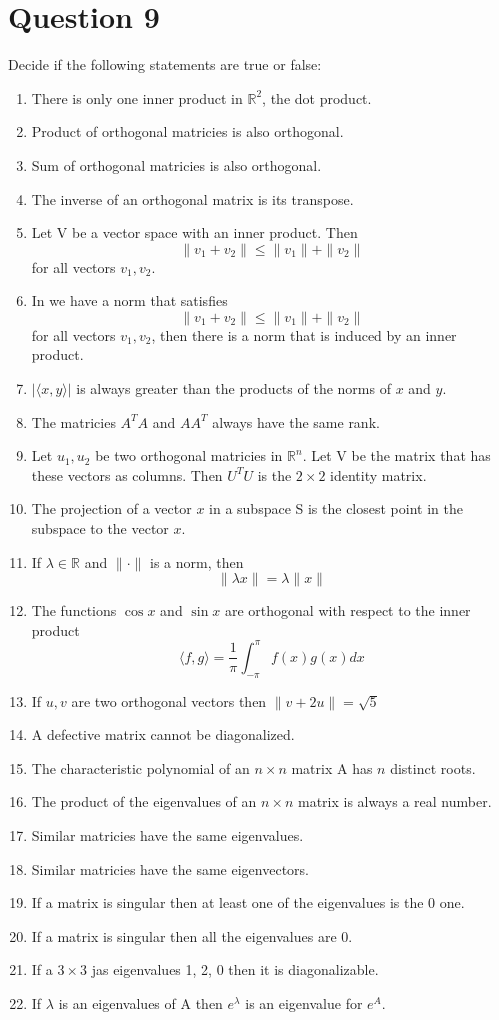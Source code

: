 \documentclass{article}
\begin{document}
\section*{Question 9}
Decide if the following statements are true or false:
\begin{enumerate}
    \item There is only one inner product in $\mathbb{R}^2$, the dot product.
    \item Product of orthogonal matricies is also orthogonal.
    \item Sum of orthogonal matricies is also orthogonal.
    \item The inverse of an orthogonal matrix is its transpose.
    \item Let V be a vector space with an inner product. Then 
    $$ \|v_1 + v_2 \| \leq \|v_1\| + \|v_2\| $$
    for all vectors $v_1, v_2$.
    \item In we have a norm that satisfies
    $$ \|v_1 + v_2 \| \leq \|v_1\| + \|v_2\| $$
    for all vectors $v_1, v_2$, then there is a norm that is induced by an inner product.
    \item $| \langle x, y \rangle |$ is always greater than the products of the norms of $x$ and $y$.
    \item The matricies $A^T A$ and $A A^T$ always have the same rank.
    \item Let $u_1, u_2$ be two orthogonal matricies in $\mathbb{R}^n$.
    Let V be the matrix that has these vectors as columns.
    Then $U^T U$ is the $2 \times 2$ identity matrix.
    \item The projection of a vector $x$ in a subspace S is the closest point in the subspace to the vector $x$.
    \item If $\lambda \in \mathbb{R}$ and $\| \cdot \|$ is a norm, then
    $$ \| \lambda x \| = \lambda \| x \| $$
    \item The functions $\cos x$ and $\sin x$ are orthogonal with respect to the inner product 
    $$ \langle f, g \rangle = \frac{1}{\pi} \int_{-\pi}^{\pi} f(x)g(x)dx $$
    \item If $u, v$ are two orthogonal vectors then $\| v + 2u \| = \sqrt{5}$
    \item A defective matrix cannot be diagonalized.
    \item The characteristic polynomial of an $n \times n$ matrix A has $n$ distinct roots.
    \item The product of the eigenvalues of an $n \times n$ matrix is always a real number.
    \item Similar matricies have the same eigenvalues.
    \item Similar matricies have the same eigenvectors.
    \item If a matrix is singular then at least one of the eigenvalues is the 0 one.
    \item If a matrix is singular then all the eigenvalues are 0.
    \item If a $3 \times 3$ jas eigenvalues 1, 2, 0 then it is diagonalizable.
    \item If $\lambda$ is an eigenvalues of A then $e^{\lambda}$ is an eigenvalue for $e^A$.
\end{enumerate}
\end{document}
